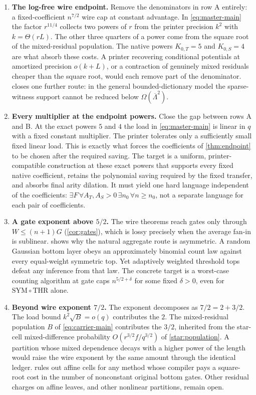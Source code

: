 \documentclass[11pt,letterpaper]{article}
\theoremstyle{definition}
\theoremstyle{remark}
\newcommand{\THR}{\mathrm{THR}}
\newcommand{\SYM}{\mathrm{SYM}}
\begin{document}
\begin{enumerate}
\item \textbf{The log-free wire endpoint.} Remove the denominators in
row A entirely: a fixed-coefficient $n^{7/2}$ wire cap at constant
advantage. In \cref{eq:master-main} the factor $r^{11/4}$ collects two
powers of $r$ from the printer precision $k^2$ with $k=\Theta(rL)$.
The other three quarters of a power come from the square root of the
mixed-residual population. The native powers $K_{0,T}=5$ and
$K_{0,S}=4$ are what absorb these costs. A printer recovering
conditional potentials at amortized precision $o(k+L)$, or a
contraction of genuinely mixed residuals cheaper than the square
root, would each remove part of the denominator. 
closes one further route: in the general bounded-dictionary model the
sparse-witness support cannot be reduced below
$\Omega(\overline\Lambda^{2})$.

\item \textbf{Every multiplier at the endpoint powers.} Close the gap
between rows A and B. At the exact powers $5$ and $4$ the load in
\cref{eq:master-main} is linear in $q$ with a fixed constant
multiplier. The printer tolerates only a sufficiently small fixed
linear load. This is exactly what forces the coefficients of
\cref{thm:endpoint} to be chosen after the required saving. The target
is a uniform, printer-compatible construction at these exact powers
that supports every fixed native coefficient, retains the polynomial
saving required by the fixed transfer, and absorbs final arity dilation.
It must yield one hard language independent of the coefficients:
$\exists F\,\forall A_T,A_S>0\,\exists n_0\,\forall n\ge n_0$,
not a separate language for each pair of coefficients.

\item \textbf{A gate exponent above $5/2$.} The wire theorems reach
gates only through $W\le(n+1)G$ (\cref{cor:gates}), which is lossy
precisely when the average fan-in is sublinear.
 shows why the natural aggregate route is
asymmetric. A random Gaussian bottom layer obeys an approximately
binomial count law against every equal-weight symmetric top. Yet
adaptively weighted threshold tops defeat any inference from that
law. The concrete target is a worst-case counting algorithm at gate
caps $n^{5/2+\delta}$ for some fixed $\delta>0$, even for
$\SYM\circ\THR$ alone.

\item \textbf{Beyond wire exponent $7/2$.} The exponent decomposes as
$7/2=2+3/2$. The load bound $k^{2}\sqrt B=o(q)$ contributes the $2$.
The mixed-residual population $B$ of \cref{eq:carrier-main}
contributes the $3/2$, inherited from the star-cell mixed-difference
probability $O(r^{3/2}f/q^{3/2})$ of \cref{star:population}. A
partition whose mixed dependence decays with a higher power of the
length would raise the wire exponent by the same amount through the
identical ledger.  rules out affine cells for any
method whose compiler pays a square-root cost in the number of
nonconstant original bottom gates. Other residual charges on affine
leaves, and other nonlinear partitions, remain open.


\end{enumerate}
\end{document}
